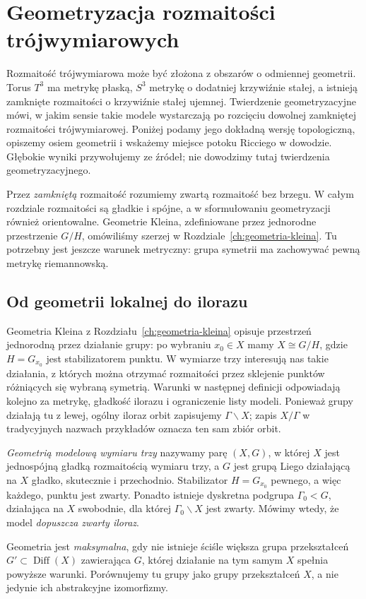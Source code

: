 \chapter{Geometryzacja rozmaitości trójwymiarowych}
\label{ch:geometrizacja-thurstona}

Rozmaitość trójwymiarowa może być złożona z obszarów o odmiennej
geometrii. Torus $T^3$ ma metrykę płaską, $S^3$ metrykę o dodatniej
krzywiźnie stałej, a istnieją zamknięte rozmaitości o krzywiźnie
stałej ujemnej. Twierdzenie geometryzacyjne mówi, w jakim sensie
takie modele wystarczają po rozcięciu dowolnej zamkniętej
rozmaitości trójwymiarowej. Poniżej podamy jego dokładną wersję topologiczną,
opiszemy osiem geometrii i wskażemy miejsce potoku Ricciego w dowodzie.
Głębokie wyniki przywołujemy ze źródeł; nie dowodzimy tutaj
twierdzenia geometryzacyjnego.

Przez \emph{zamkniętą} rozmaitość rozumiemy zwartą rozmaitość bez
brzegu. W całym rozdziale rozmaitości są gładkie i spójne, a w
sformułowaniu geometryzacji również orientowalne. Geometrie Kleina,
zdefiniowane przez jednorodne przestrzenie $G/H$, omówiliśmy szerzej
w Rozdziale~\ref{ch:geometria-kleina}. Tu potrzebny jest jeszcze
warunek metryczny: grupa symetrii ma zachowywać pewną metrykę
riemannowską.

\section{Od geometrii lokalnej do ilorazu}
\label{sec:thurston-model}

Geometria Kleina z Rozdziału~\ref{ch:geometria-kleina} opisuje przestrzeń
jednorodną przez działanie grupy: po wybraniu $x_0\in X$ mamy
$X\cong G/H$, gdzie $H=G_{x_0}$ jest stabilizatorem punktu.
W wymiarze trzy interesują nas takie działania, z których można
otrzymać rozmaitości przez sklejenie punktów różniących się wybraną
symetrią. Warunki w następnej definicji odpowiadają kolejno za
metrykę, gładkość ilorazu i ograniczenie listy modeli.
Ponieważ grupy działają tu z lewej, ogólny iloraz orbit zapisujemy
$\Gamma\backslash X$; zapis $X/\Gamma$ w tradycyjnych nazwach
przykładów oznacza ten sam zbiór orbit.

\begin{definicja}
\label{def:thurston-model}
\emph{Geometrią modelową wymiaru trzy} nazywamy parę $(X,G)$,
w której $X$ jest jednospójną gładką rozmaitością wymiaru trzy,
a $G$ jest grupą Liego działającą na $X$ gładko, skutecznie
i przechodnio. Stabilizator $H=G_{x_0}$ pewnego, a więc każdego,
punktu jest zwarty. Ponadto istnieje dyskretna podgrupa
$\Gamma_0<G$, działająca na $X$ swobodnie, dla której
$\Gamma_0\backslash X$ jest zwarty. Mówimy wtedy, że model
\emph{dopuszcza zwarty iloraz}.

Geometria jest \emph{maksymalna}, gdy nie istnieje ściśle większa
grupa przekształceń $G'\subset\operatorname{Diff}(X)$ zawierająca
$G$, której działanie na tym samym $X$ spełnia powyższe warunki.
Porównujemy tu grupy jako grupy przekształceń $X$, a nie jedynie
ich abstrakcyjne izomorfizmy.
\end{definicja}

